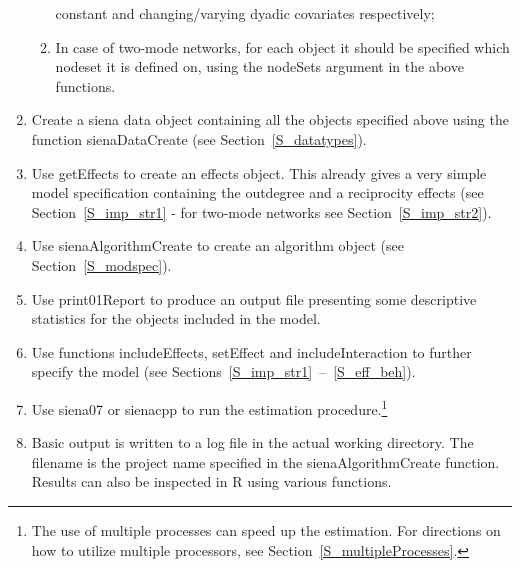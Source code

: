 \documentclass[a4paper,fleqn,11pt]{article}
\newcommand{\+}{\, + \,}
\newcommand{\sfn}[1]{\textsf{#1}}
\newcommand{\R}{{\sf R }}
\begin{document}
\begin{enumerate}
\begin{enumerate}
                constant and changing/varying dyadic covariates respectively;
		\item	In case of two-mode networks, for each object it should
                be specified which nodeset it is defined on, using the
                \sfn{nodeSets} argument in the above functions.
	\end{enumerate}
	\item	Create a \textsf{siena} data object containing all the objects
            specified above using the function \sfn{sienaDataCreate}
            (see Section~\ref{S_datatypes}).
	\item	Use \sfn{getEffects} to create an effects object.
            This already gives a very simple model specification
            containing the outdegree and a reciprocity effects
            (see Section~\ref{S_imp_str1} - for two-mode networks see
            Section~\ref{S_imp_str2}).
	\item	Use \sfn{sienaAlgorithmCreate} to create an algorithm object
                (see Section~\ref{S_modspec}).
	\item	Use \sfn{print01Report} to produce an output file
                 presenting some descriptive statistics
                for the objects included in the model.
	\item	Use functions \sfn{includeEffects}, \sfn{setEffect} and
            \sfn{includeInteraction} to further specify the model
            (see Sections~\ref{S_imp_str1}~--~\ref{S_eff_beh}).
	\item	Use \sfn{siena07} or \sfn{sienacpp}
            to run the estimation procedure.\footnote{The
            use of multiple processes can speed up the estimation.
            For directions on how to utilize multiple processors,
            see Section~\ref{S_multipleProcesses}.}
	\item	Basic output is written to a log file in the actual working directory.
             The filename is the project name specified in the
             \sfn{sienaAlgorithmCreate} function. Results can also be
             inspected in \R using various functions.
\end{enumerate}
\end{document}
